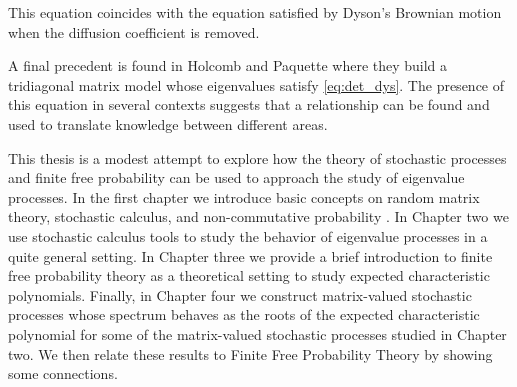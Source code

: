 This equation coincides with the equation satisfied by Dyson's Brownian motion when the diffusion coefficient is removed.

A final precedent is found in Holcomb and Paquette \cite{article:holcomb_paquette} where they build a tridiagonal matrix model whose eigenvalues satisfy \eqref{eq:det_dys}. The presence of this equation in several contexts suggests that a relationship can be found and used to translate knowledge between different areas.

This thesis is a modest attempt to explore how the theory of stochastic processes and finite free probability can be used to approach the study of eigenvalue processes. In the first chapter we introduce basic concepts on random matrix theory, stochastic calculus, and non-commutative probability . In Chapter two we use stochastic calculus tools to study the behavior of eigenvalue processes in a quite general setting. In Chapter three we provide a brief introduction to finite free probability theory as a theoretical setting to study expected characteristic polynomials. Finally, in Chapter four we construct matrix-valued stochastic processes whose spectrum behaves as the roots of the expected characteristic polynomial for some of the matrix-valued stochastic processes studied in Chapter two. We then relate these results to Finite Free Probability Theory by showing some connections. 